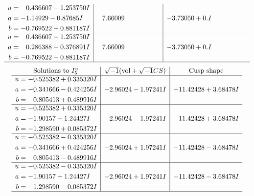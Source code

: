 \documentclass[1p]{elsarticle_modified}
\theoremstyle{definition}
\newcommand{\I}{\sqrt{-1}}
\begin{document}
$$\begin{array}{c|c|c}
\begin{aligned}
u &= \phantom{-}0.436607 - 1.253750 I \\
a &= -1.14929 - 0.87685 I \\
b &= -0.769522 + 0.881187 I\end{aligned}
 & \phantom{-}7.66009\phantom{ +0.000000I} & -3.73050 + 0. I\phantom{ +0.000000I} \\ \hline\begin{aligned}
u &= \phantom{-}0.436607 - 1.253750 I \\
a &= \phantom{-}0.286388 - 0.376891 I \\
b &= -0.769522 - 0.881187 I\end{aligned}
 & \phantom{-}7.66009\phantom{ +0.000000I} & -3.73050 + 0. I\phantom{ +0.000000I}\\
 \hline 
 \end{array}$$\newpage$$\begin{array}{c|c|c}  
\text{Solutions to }I^u_{5}& \I (\text{vol} + \sqrt{-1}CS) & \text{Cusp shape}\\
 \hline 
\begin{aligned}
u &= -0.525382 + 0.335320 I \\
a &= -0.341666 - 0.424256 I \\
b &= \phantom{-}0.805413 + 0.489916 I\end{aligned}
 & -2.96024 - 1.97241 I & -11.42428 + 3.68478 I \\ \hline\begin{aligned}
u &= -0.525382 + 0.335320 I \\
a &= -1.90157 - 1.24427 I \\
b &= -1.298590 + 0.085372 I\end{aligned}
 & -2.96024 - 1.97241 I & -11.42428 + 3.68478 I \\ \hline\begin{aligned}
u &= -0.525382 - 0.335320 I \\
a &= -0.341666 + 0.424256 I \\
b &= \phantom{-}0.805413 - 0.489916 I\end{aligned}
 & -2.96024 + 1.97241 I & -11.42428 - 3.68478 I \\ \hline\begin{aligned}
u &= -0.525382 - 0.335320 I \\
a &= -1.90157 + 1.24427 I \\
b &= -1.298590 - 0.085372 I\end{aligned}
 & -2.96024 + 1.97241 I & -11.42428 - 3.68478 I\\
 \hline 
 \end{array}$$\newpage\newpage\renewcommand{\arraystretch}{1}
\end{document}
